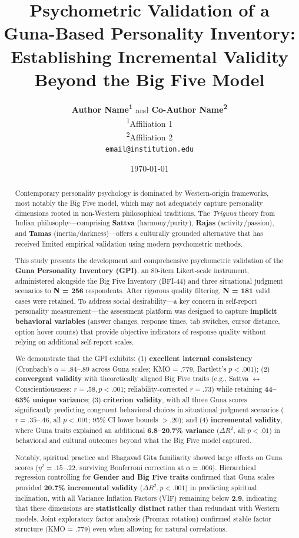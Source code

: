 \documentclass[a4paper,11pt]{article}
\title{\textbf{Psychometric Validation of a Guna-Based Personality Inventory: Establishing Incremental Validity Beyond the Big Five Model}}
\author{\textbf{Author Name\textsuperscript{1}} and \textbf{Co-Author Name\textsuperscript{2}} \\
\small \textsuperscript{1}Affiliation 1 \\
\small \textsuperscript{2}Affiliation 2 \\
\small \texttt{email@institution.edu}}
\date{\today}
\begin{document}
\maketitle

\begin{abstract}
Contemporary personality psychology is dominated by Western-origin frameworks, most notably the Big Five model, which may not adequately capture personality dimensions rooted in non-Western philosophical traditions. The \textit{Triguna} theory from Indian philosophy—comprising \textbf{Sattva} (harmony/purity), \textbf{Rajas} (activity/passion), and \textbf{Tamas} (inertia/darkness)—offers a culturally grounded alternative that has received limited empirical validation using modern psychometric methods.

This study presents the development and comprehensive psychometric validation of the \textbf{Guna Personality Inventory (GPI)}, an 80-item Likert-scale instrument, administered alongside the Big Five Inventory (BFI-44) and three situational judgment scenarios to \textbf{N = 256} respondents. After rigorous quality filtering, \textbf{N = 181} valid cases were retained. To address social desirability—a key concern in self-report personality measurement—the assessment platform was designed to capture \textbf{implicit behavioral variables} (answer changes, response times, tab switches, cursor distance, option hover counts) that provide objective indicators of response quality without relying on additional self-report scales.

We demonstrate that the GPI exhibits: (1) \textbf{excellent internal consistency} (Cronbach's $\alpha = .84$--$.89$ across Guna scales; KMO = .779, Bartlett's $p < .001$); (2) \textbf{convergent validity} with theoretically aligned Big Five traits (e.g., Sattva $\leftrightarrow$ Conscientiousness: $r = .58, p < .001$; reliability-corrected $r = .73$) while retaining \textbf{44--63\% unique variance}; (3) \textbf{criterion validity}, with all three Guna scores significantly predicting congruent behavioral choices in situational judgment scenarios ($r = .35$--$.46$, all $p < .001$; 95\% CI lower bounds $> .20$); and (4) \textbf{incremental validity}, where Guna traits explained an additional \textbf{6.8--20.7\% variance} ($\Delta R^2$, all $p < .01$) in behavioral and cultural outcomes beyond what the Big Five model captured.

Notably, spiritual practice and Bhagavad Gita familiarity showed large effects on Guna scores ($\eta^2 = .15$--$.22$, surviving Bonferroni correction at $\alpha = .006$). Hierarchical regression controlling for \textbf{Gender and Big Five traits} confirmed that Guna scales provided \textbf{20.7\% incremental validity} ($\Delta R^2, p < .001$) in predicting spiritual inclination, with all Variance Inflation Factors (VIF) remaining below \textbf{2.9}, indicating that these dimensions are \textbf{statistically distinct} rather than redundant with Western models. Joint exploratory factor analysis (Promax rotation) confirmed stable factor structure (KMO = .779) even when allowing for natural correlations.


\end{abstract}
\end{document}
